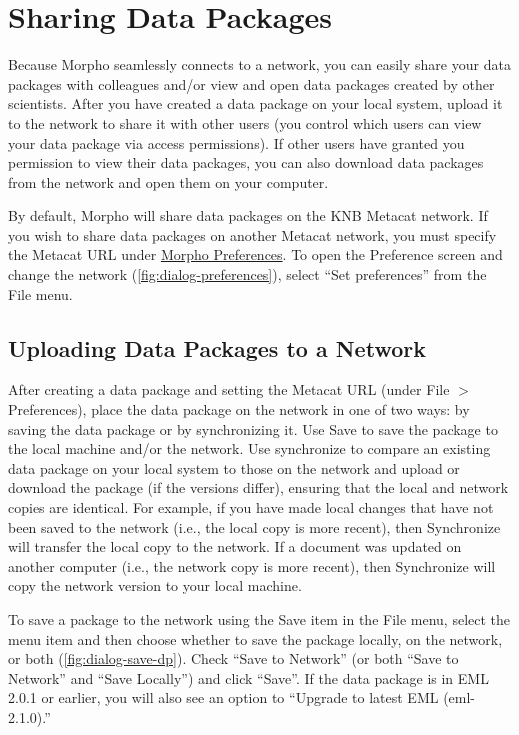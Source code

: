 \section{Sharing Data Packages} \label{sec:sharing}

Because Morpho seamlessly connects to a network, you can easily share
your data packages with colleagues and/or view and open data packages
created by other scientists. After you have created a data package on
your local system, upload it to the network to share it with other users
(you control which users can view your data package via access
permissions). If other users have granted you permission to view their
data packages, you can also download data packages from the network and
open them on your computer.

By default, Morpho will share data packages on the KNB Metacat network.
If you wish to share data packages on another Metacat network, you must
specify the Metacat URL under \hyperref[sec:preferences]{Morpho
Preferences}. To open the Preference screen and change the network
(\autoref{fig:dialog-preferences}), select ``Set preferences'' from the
File menu.

\subsection{Uploading Data Packages to a Network} \label{sec:uploading}

After creating a data package and setting the Metacat URL (under File
$>$ Preferences), place the data package on the network in one of two
ways: by saving the data package or by synchronizing it. Use Save to
save the package to the local machine and/or the network. Use
synchronize to compare an existing data package on your local system to
those on the network and upload or download the package (if the versions
differ), ensuring that the local and network copies are identical. For
example, if you have made local changes that have not been saved to the
network (i.e., the local copy is more recent), then Synchronize will
transfer the local copy to the network. If a document was updated on
another computer (i.e., the network copy is more recent), then
Synchronize will copy the network version to your local machine.

To save a package to the network using the Save item in the File menu,
select the menu item and then choose whether to save the package
locally, on the network, or both (\autoref{fig:dialog-save-dp}).  Check
``Save to Network'' (or both ``Save to Network'' and ``Save Locally'')
and click ``Save''. If the data package is in EML 2.0.1 or earlier, you
will also see an option to ``Upgrade to latest EML (eml-2.1.0).'' 

